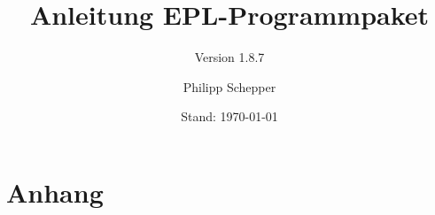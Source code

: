 \documentclass[a4paper,ngerman,oneside]{scrbook}
\title{Anleitung EPL-Programmpaket}
\subtitle{Version 1.8.7}
\author{Philipp Schepper}
\date{Stand: \today}
\begin{document}
\maketitle

\frontmatter
\tableofcontents


\mainmatter






\appendix
\part{Anhang}

\end{document}
